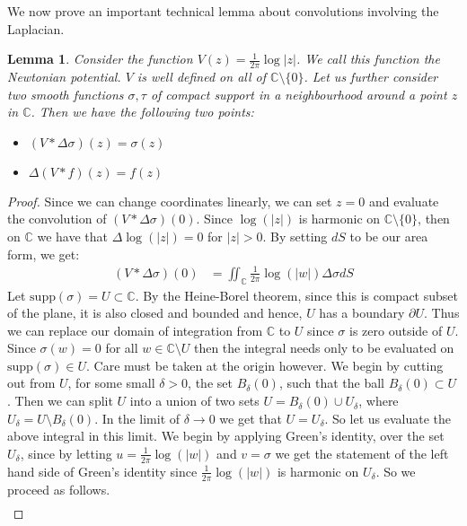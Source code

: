 \documentclass[11pt]{report}
\newtheorem{lemma}[thm]{Lemma}
\theoremstyle{definition}
\begin{document}
We now prove an important technical lemma about convolutions involving the Laplacian.
\begin{lemma}\label{ConvProperties}
  Consider the function $V(z) = \frac{1}{2\pi}\log|z|$. We call this function the Newtonian potential. $V$ is well defined on all of $\mathbb{C}\setminus\{0\}$. Let us further consider two smooth functions $\sigma, \tau$ of compact support in a neighbourhood around a point $z$ in $\mathbb{C}$. Then we have the following two points:
  \begin{itemize}
    \item $(V * \Delta \sigma)(z)=\sigma(z)$
    \item $\Delta(V * f)(z) = f(z)$
  \end{itemize}
\end{lemma}

\begin{proof}
  Since we can change coordinates linearly, we can set $z=0$ and evaluate the convolution of $(V * \Delta \sigma)(0)$. Since $\log(|z|)$ is harmonic on $\mathbb{C}\setminus \{0\}$, then on $\mathbb{C}$ we have that $\Delta \log(|z|) = 0$ for $\vert z \vert > 0$. By setting $dS$ to be our area form, we get:
  \begin{align*}
    (V * \Delta \sigma)(0) &= \iint_{\mathbb{C}}\frac{1}{2\pi}\log(|w|)\Delta \sigma dS
  \end{align*}
  Let $\text{supp}(\sigma) = U \subset \mathbb{C}$. By the Heine-Borel theorem, since this is compact subset of the plane, it is also closed and bounded and hence, $U$ has a boundary $\partial U$. Thus we can replace our domain of integration from $\mathbb{C}$ to $U$ since $\sigma$ is zero outside of $U$. Since $\sigma(w) = 0$ for all $w \in \mathbb{C}\setminus U$ then the integral needs only to be evaluated on $\text{supp}(\sigma) \in U$. Care must be taken at the origin however. We begin by cutting out from $U$, for some small $\delta >0$, the set $B_{\delta}(0)$, such that the ball $B_{\delta}(0) \subset U$. Then we can split $U$ into a union of two sets $U=B_{\delta}(0) \cup U_{\delta}$, where $U_{\delta} = U\setminus B_{\delta}(0)$. In the limit of $\delta \rightarrow 0$ we get that $U=U_{\delta}$. So let us evaluate the above integral in this limit.
  We begin by applying Green's identity, over the set $U_{\delta}$, since by letting $u = \frac{1}{2\pi}\log(|w|)$ and $v = \sigma$ we get the statement of the left hand side of Green's identity since $\frac{1}{2\pi}\log(|w|)$ is harmonic on $U_{\delta}$. So we proceed as follows.
  \begin{align*}

\end{align*}
\end{proof}
\end{document}
